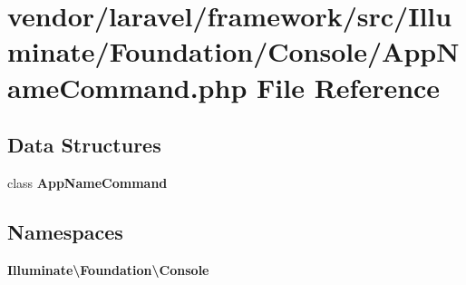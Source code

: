 \section{vendor/laravel/framework/src/\+Illuminate/\+Foundation/\+Console/\+App\+Name\+Command.php File Reference}
\label{_app_name_command_8php}
\subsection*{Data Structures}
\begin{DoxyCompactItemize}
\item 
class {\bf App\+Name\+Command}
\end{DoxyCompactItemize}
\subsection*{Namespaces}
\begin{DoxyCompactItemize}
\item 
 {\bf Illuminate\textbackslash{}\+Foundation\textbackslash{}\+Console}
\end{DoxyCompactItemize}
